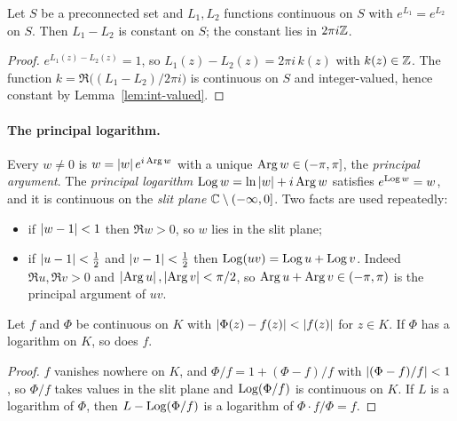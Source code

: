 
\begin{lemma}[Uniqueness]\label{lem:log-unique}
Let $S$ be a preconnected set and $L_1,L_2$ functions continuous on $S$ with $e^{L_1}=e^{L_2}$ on
$S$. Then $L_1-L_2$ is constant on $S$; the constant lies in $2\pi i\mathbb{Z}$.
\end{lemma}

\begin{proof}
$e^{L_1(z)-L_2(z)}=1$, so $L_1(z)-L_2(z)=2\pi i\,k(z)$ with $k(z)\in\mathbb{Z}$. The function
$k=\Re\big((L_1-L_2)/2\pi i\big)$ is continuous on $S$ and integer-valued, hence constant by
Lemma~\ref{lem:int-valued}.
\end{proof}


\paragraph{The principal logarithm.} Every $w\neq0$ is $w=\left\lvert w\right\rvert e^{i\operatorname{Arg} w}$ with a unique
$\operatorname{Arg} w\in(-\pi,\pi]$, the \emph{principal argument}. The \emph{principal logarithm}
$\operatorname{Log} w=\ln\left\lvert w\right\rvert+i\operatorname{Arg} w$ satisfies $e^{\operatorname{Log} w}=w$, and it is continuous on the \emph{slit plane}
$\mathbb{C}\setminus(-\infty,0]$. Two facts are used repeatedly:
\begin{itemize}
\item if $\left\lvert w-1\right\rvert<1$ then $\Re w>0$, so $w$ lies in the slit plane;
\item if $\left\lvert u-1\right\rvert<\frac12$ and $\left\lvert v-1\right\rvert<\frac12$ then $\operatorname{Log}(uv)=\operatorname{Log} u+\operatorname{Log} v$. Indeed $\Re u,\Re
v>0$ and $\left\lvert \operatorname{Arg} u\right\rvert,\left\lvert \operatorname{Arg} v\right\rvert<\pi/2$, so $\operatorname{Arg} u+\operatorname{Arg} v\in(-\pi,\pi)$ is the principal
argument of $uv$.
\end{itemize}


\begin{lemma}\label{lem:log-near}
Let $f$ and $\Phi$ be continuous on $K$ with $\left\lvert \Phi(z)-f(z)\right\rvert<\left\lvert f(z)\right\rvert$ for $z\in K$. If $\Phi$
has a logarithm on $K$, so does $f$.
\end{lemma}

\begin{proof}
$f$ vanishes nowhere on $K$, and $\Phi/f=1+(\Phi-f)/f$ with $\left\lvert (\Phi-f)/f\right\rvert<1$, so $\Phi/f$ takes
values in the slit plane and $\operatorname{Log}(\Phi/f)$ is continuous on $K$. If $L$ is a logarithm of $\Phi$,
then $L-\operatorname{Log}(\Phi/f)$ is a logarithm of $\Phi\cdot f/\Phi=f$.
\end{proof}


